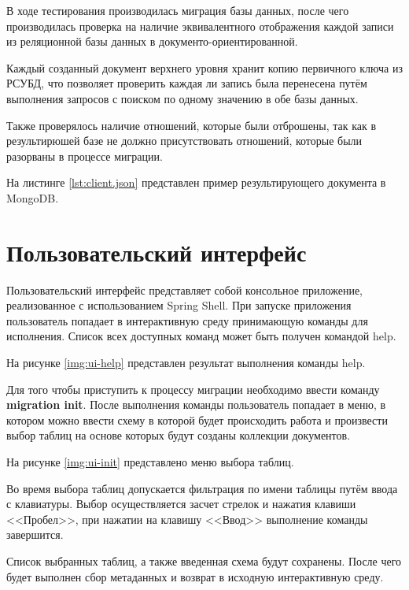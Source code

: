 В ходе тестирования производилась миграция базы данных, 
после чего производилась проверка на наличие эквивалентного отображения каждой записи из 
реляционной базы данных в документо-ориентированной.

Каждый созданный документ верхнего уровня хранит копию первичного ключа из РСУБД,
что позволяет проверить каждая ли запись была перенесена путём выполнения запросов 
с поиском по одному значению в обе базы данных.

Также проверялось наличие отношений, которые были отброшены, 
так как в результирюшей базе не должно присутствовать отношений, 
которые были разорваны в процессе миграции.

На листинге \ref{lst:client.json} представлен пример результирующего документа в MongoDB.


\clearpage


\section{Пользовательский интерфейс}
Пользовательский интерфейс представляет собой консольное приложение, реализованное с использованием Spring Shell.
При запуске приложения пользователь попадает в интерактивную среду принимающую команды для исполнения.
Список всех доступных команд может быть получен командой \textmd{help}.

На рисунке \ref{img:ui-help} представлен результат выполнения команды \textmd{help}.

Для того чтобы приступить к процессу миграции необходимо ввести команду \textbf{migration init}. 
После выполнения команды пользователь попадает в меню, 
в котором можно ввести схему в которой будет происходить работа
и произвести выбор таблиц на основе которых будут созданы коллекции документов.

\clearpage

На рисунке \ref{img:ui-init} представлено меню выбора таблиц.

Во время выбора таблиц допускается фильтрация по имени таблицы путём ввода с клавиатуры.
Выбор осуществляется засчет стрелок и нажатия клавиши <<Пробел>>, 
при нажатии на клавишу <<Ввод>> выполнение команды завершится.

Список выбранных таблиц, а также введенная схема будут сохранены.
После чего будет выполнен сбор метаданных и возврат в исходную интерактивную среду.

